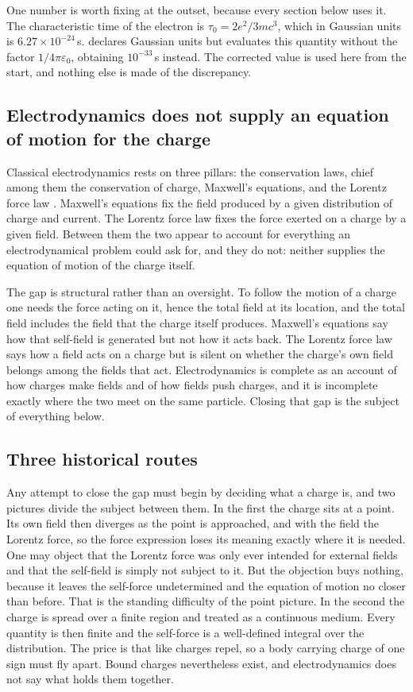 \documentclass[preprint]{aastex701}
\newcommand{\taunought}{\tau_0}
\begin{document}
One number is worth fixing at the outset, because every section below uses it.
The characteristic time of the electron is $\taunought = 2e^2/3mc^3$, which in
Gaussian units is $6.27\times10^{-24}\,$s. \citet{zhang2006} declares Gaussian
units but evaluates this quantity without the factor $1/4\pi\varepsilon_0$,
obtaining $10^{-33}\,$s instead. The corrected value is used here from the
start, and nothing else is made of the discrepancy.

\subsection{Electrodynamics does not supply an equation of motion for the charge}

Classical electrodynamics rests on three pillars: the conservation laws, chief
among them the conservation of charge, Maxwell's equations, and the Lorentz
force law \citep{zhang_zongsui}. Maxwell's equations fix the field produced by a given distribution of charge
and current. The Lorentz force law fixes the force exerted on a charge by a
given field. Between them the two appear to account for everything an
electrodynamical problem could ask for, and they do not: neither supplies the
equation of motion of the charge itself.

The gap is structural rather than an oversight. To follow the motion of a charge
one needs the force acting on it, hence the total field at its location, and the
total field includes the field that the charge itself produces. Maxwell's
equations say how that self-field is generated but not how it acts back. The
Lorentz force law says how a field acts on a charge but is silent on whether the
charge's own field belongs among the fields that act. Electrodynamics is
complete as an account of how charges make fields and of how fields push
charges, and it is incomplete exactly where the two meet on the same particle.
Closing that gap is the subject of everything below.

\subsection{Three historical routes}

Any attempt to close the gap must begin by deciding what a charge is, and two
pictures divide the subject between them. In the first the charge sits at a
point. Its own field then diverges as the point is approached, and with the
field the Lorentz force, so the force expression loses its meaning exactly where
it is needed. One may object that the Lorentz force was only ever intended for
external fields and that the self-field is simply not subject to it. But the
objection buys nothing, because it leaves the self-force undetermined and the
equation of motion no closer than before. That is the standing difficulty of the
point picture. In the second the charge is spread over a finite region and
treated as a continuous medium. Every quantity is then finite and the self-force
is a well-defined integral over the distribution. The price is that like charges
repel, so a body carrying charge of one sign must fly apart. Bound charges
nevertheless exist, and electrodynamics does not say what holds them together.
\end{document}

